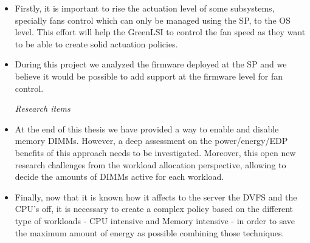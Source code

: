 \begin{itemize}

\item Firstly, it is important to rise the actuation level of some subsystems, specially fans control which can only be managed using the SP, to the OS level. This effort will help the GreenLSI to control the fan speed as they want to be able to create solid actuation policies.

\item During this project we analyzed the firmware deployed at the SP and we believe it would be possible to add support at the firmware level for fan control.



\emph{Research items}

\item At the end of this thesis we have provided a way to enable and disable memory DIMMs. However, a deep assessment on the power/energy/EDP benefits of this approach needs to be investigated. Moreover, this open new research challenges from the workload allocation perspective, allowing to decide the amounts of DIMMs active for each workload.

\item Finally, now that it is known how it affects to the server the DVFS and the CPU's off, it is necessary to create a complex policy based on the different type of workloads - CPU intensive and Memory intensive - in order to save the maximum amount of energy as possible combining those techniques.
\end{itemize}